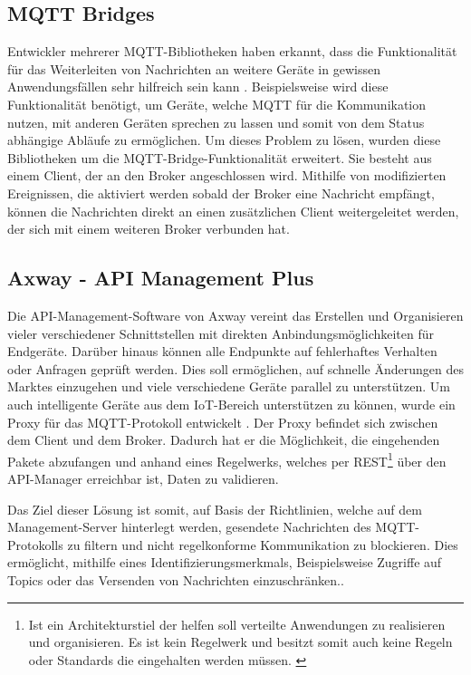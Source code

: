     \subsection{MQTT Bridges}
        Entwickler mehrerer MQTT-Bibliotheken haben erkannt, dass die Funktionalität für das Weiterleiten von Nachrichten an weitere Geräte in gewissen Anwendungsfällen sehr hilfreich sein kann \cite{84codes_ab_2016,light_2019}. Beispielsweise wird diese Funktionalität benötigt, um Geräte, welche \ac{MQTT} für die Kommunikation nutzen, mit anderen Geräten sprechen zu lassen und somit von dem Status abhängige Abläufe zu ermöglichen.
        Um dieses Problem zu lösen, wurden diese Bibliotheken um die MQTT-Bridge-Funktionalität erweitert. Sie besteht aus einem Client, der an den Broker angeschlossen wird. Mithilfe von modifizierten Ereignissen, die aktiviert werden sobald der Broker eine Nachricht empfängt, können die Nachrichten direkt an einen zusätzlichen Client weitergeleitet werden, der sich mit einem weiteren Broker verbunden hat.
    
    \subsection{Axway - API Management Plus}
        Die API-Management-Software von Axway vereint das Erstellen und Organisieren vieler verschiedener Schnittstellen mit direkten Anbindungsmöglichkeiten für Endgeräte. Darüber hinaus können alle Endpunkte auf fehlerhaftes Verhalten oder Anfragen geprüft werden. Dies soll ermöglichen, auf schnelle Änderungen des Marktes einzugehen und viele verschiedene Geräte parallel zu unterstützen.
        Um auch intelligente Geräte aus dem \ac{IoT}-Bereich unterstützen zu können, wurde ein Proxy für das \ac{MQTT}-Protokoll entwickelt \cite{axway_2018}. Der Proxy befindet sich zwischen dem Client und dem Broker. Dadurch hat er die Möglichkeit, die eingehenden Pakete abzufangen und anhand eines Regelwerks, welches per \ac{REST}\footnote{Ist ein Architekturstiel der helfen soll verteilte Anwendungen zu realisieren und organisieren. Es ist kein Regelwerk und besitzt somit auch keine Regeln oder Standards die eingehalten werden müssen. \cite{Doglio2015}} über den \acs{API}-Manager erreichbar ist, Daten zu validieren.
        
        Das Ziel dieser Lösung ist somit, auf Basis der Richtlinien, welche auf dem Management-Server hinterlegt werden, gesendete Nachrichten des \ac{MQTT}-Protokolls zu filtern und nicht regelkonforme Kommunikation zu blockieren. Dies ermöglicht, mithilfe eines Identifizierungsmerkmals, Beispielsweise Zugriffe auf Topics oder das Versenden von Nachrichten einzuschränken..
        
